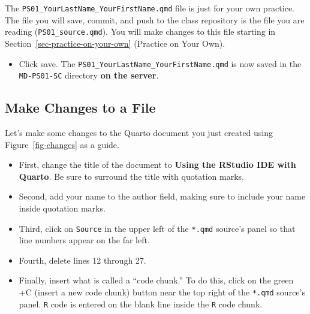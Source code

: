 \documentclass[
  letterpaper,
  DIV=11,
  numbers=noendperiod]{scrartcl}
\providecommand{\tightlist}{%
  \setlength{\itemsep}{0pt}\setlength{\parskip}{0pt}}\usepackage{longtable,booktabs,array}
\begin{document}
\begin{tcolorbox}[enhanced jigsaw, titlerule=0mm, toprule=.15mm, arc=.35mm, colbacktitle=quarto-callout-warning-color!10!white, coltitle=black, colframe=quarto-callout-warning-color-frame, left=2mm, breakable, bottomtitle=1mm, toptitle=1mm, bottomrule=.15mm, title=\textcolor{quarto-callout-warning-color}{\faExclamationTriangle}\hspace{0.5em}{Warning}, colback=white, rightrule=.15mm, opacityback=0, opacitybacktitle=0.6, leftrule=.75mm]

The \texttt{PS01\_YourLastName\_YourFirstName.qmd} file is just for your
own practice. The file you will save, commit, and push to the class
repository is the file you are reading (\texttt{PS01\_source.qmd}). You
will make changes to this file starting in
Section~\ref{sec-practice-on-your-own} (Practice on Your Own).

\end{tcolorbox}

\begin{itemize}
\tightlist
\item
  Click save. The \texttt{PS01\_YourLastName\_YourFirstName.qmd} is now
  saved in the \texttt{MD-PS01-SC} directory \textbf{on the server}.
\end{itemize}

\hypertarget{make-changes-to-a-file}{%
\subsection{Make Changes to a File}\label{make-changes-to-a-file}}

Let's make some changes to the Quarto document you just created using
Figure~\ref{fig-changes} as a guide.

\begin{itemize}
\item
  First, change the title of the document to \textbf{Using the RStudio
  IDE with Quarto}. Be sure to surround the title with quotation marks.
\item
  Second, add your name to the author field, making sure to include your
  name inside quotation marks.
\item
  Third, click on \texttt{Source} in the upper left of the
  \texttt{*.qmd} source's panel so that line numbers appear on the far
  left.
\item
  Fourth, delete lines 12 through 27.
\item
  Finally, insert what is called a ``code chunk.'' To do this, click on
  the green +C (insert a new code chunk) button near the top right of
  the \texttt{*.qmd} source's panel. \texttt{R} code is entered on the
  blank line inside the \texttt{R} code chunk.
\end{itemize}
\end{document}

